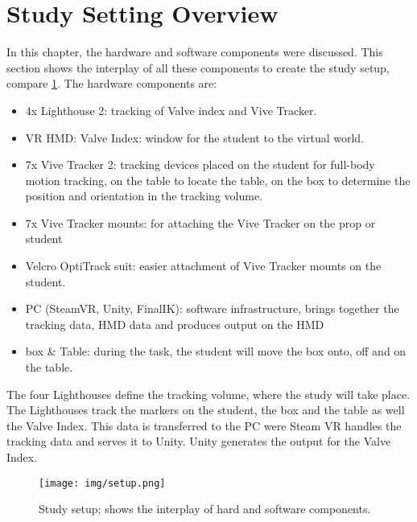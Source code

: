 \section{Study Setting Overview}
In this chapter, the hardware and software components were discussed. This section shows the interplay of all these components to create the study setup, compare \ref{fig:setup}.
The hardware components are:
\begin{itemize}
	\item 4x Lighthouse 2: tracking of Valve index and Vive Tracker.
	\item VR HMD: Valve Index: window for the student to the virtual world.
	\item 7x Vive Tracker 2: tracking devices placed on the student for full-body motion tracking, on the table to locate the table, on the box to determine the position and orientation in the tracking volume.
	\item 7x Vive Tracker mounts: for attaching the Vive Tracker on the prop or student
	\item Velcro OptiTrack suit: easier attachment of Vive Tracker mounts on the student.
	\item PC (SteamVR, Unity, FinalIK): software infrastructure, brings together the tracking data, HMD data and produces output on the HMD
	\item box \& Table: during the task, the student will move the box onto, off and on the table.
\end{itemize}
The four Lighthouses define the tracking volume, where the study will take place. The Lighthouses track the markers on the student, the box and the table as well the Valve Index. This data is transferred to the PC were Steam VR handles the tracking data and serves it to Unity. Unity generates the output for the Valve Index.
\begin{figure}
	\centering
	\texttt{[image: img/setup.png]}
	\caption{Study setup; shows the interplay of hard and software components.}
	\label{fig:setup}
\end{figure}
